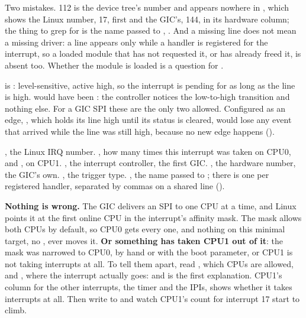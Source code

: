  Two mistakes. 112 is the device tree's number and appears nowhere in
, which shows the Linux number, 17, first and the GIC's, 144, in its hardware
column; the thing to grep for is the name passed to , . And a
missing line does not mean a missing driver: a line appears only while a handler is registered for
the interrupt, so a loaded module that has not requested it, or has already freed it, is absent
too. Whether the module is loaded is a question for .

  is : level-sensitive, active high, so the interrupt is
pending for as long as the line is high.  would have been : the
controller notices the low-to-high transition and nothing else. For a GIC SPI these are the only
two allowed. Configured as an edge, , which holds its line high until its status is
cleared, would lose any event that arrived while the line was still high, because no new edge
happens ().


 , the Linux IRQ number. , how many times this interrupt was taken on
CPU0, and , on CPU1. , the interrupt controller, the first GIC. , the
hardware number, the GIC's own. , the trigger type. , the name passed to
; there is one per registered handler, separated by commas on a shared line
().

 \textbf{Nothing is wrong.} The GIC delivers an SPI to one CPU at a time, and Linux points
it at the first online CPU in the interrupt's affinity mask. The mask allows both CPUs by default,
so CPU0 gets every one, and nothing on this minimal target, no , ever moves it.
\textbf{Or something has taken CPU1 out of it}: the mask was narrowed to CPU0, by hand or with the
 boot parameter, or CPU1 is not taking interrupts at all. To tell them apart,
read , which CPUs are allowed, and
, where the interrupt actually goes:  and
 is the first explanation. CPU1's column for the other interrupts, the timer and the IPIs,
shows whether it takes interrupts at all. Then write  to  and watch
CPU1's count for interrupt 17 start to climb.

